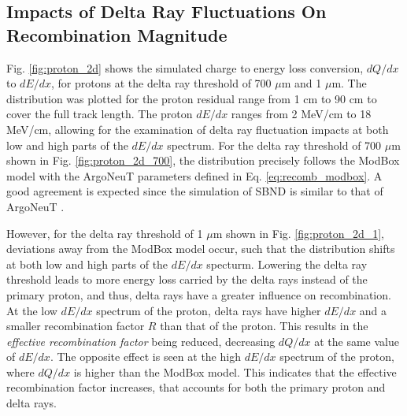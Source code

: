 \subsection{Impacts of Delta Ray Fluctuations On Recombination Magnitude}
\label{sec:impactDeltaRayMag}

Fig. \ref{fig:proton_2d} shows the simulated charge to energy loss conversion, $dQ/dx$ to $dE/dx$, for protons at the delta ray threshold of 700 $\mu$m and 1 $\mu$m.
The distribution was plotted for the proton residual range from 1 cm to 90 cm to cover the full track length. 
The proton $dE/dx$ ranges from 2 MeV/cm to 18 MeV/cm, allowing for the examination of delta ray fluctuation impacts at both low and high parts of the $dE/dx$ spectrum. 
For the delta ray threshold of 700 $\mu$m shown in Fig. \ref{fig:proton_2d_700}, the distribution precisely follows the ModBox model with the ArgoNeuT parameters defined in Eq. \ref{eq:recomb_modbox}.
A good agreement is expected since the simulation of SBND is similar to that of ArgoNeuT \cite{argoneut_recomb}.

However, for the delta ray threshold of 1 $\mu$m shown in Fig. \ref{fig:proton_2d_1}, deviations away from the ModBox model occur, such that the distribution shifts at both low and high parts of the $dE/dx$ specturm. 
Lowering the delta ray threshold leads to more energy loss carried by the delta rays instead of the primary proton, and thus, delta rays have a greater influence on recombination.
At the low $dE/dx$ spectrum of the proton, delta rays have higher $dE/dx$ and a smaller recombination factor $R$ than that of the proton.
This results in the \textit{effective recombination factor} being reduced, decreasing $dQ/dx$ at the same value of $dE/dx$. 
The opposite effect is seen at the high $dE/dx$ spectrum of the proton, where $dQ/dx$ is higher than the ModBox model.
This indicates that the effective recombination factor increases, that accounts for both the primary proton and delta rays.


